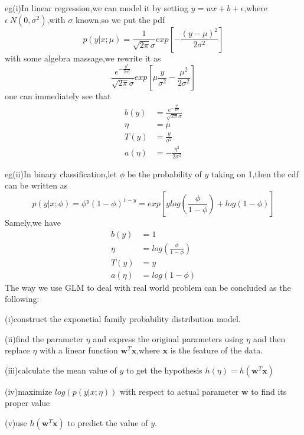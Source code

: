 \documentclass[a4paper,12pt]{article}
\begin{document}
eg(i)In linear regression,we can model it by setting $y=wx+b+\epsilon$,where $\epsilon~N(0,\sigma^2)$,with $\sigma$ known,so we put the pdf$$p(y|x;\mu)=\frac{1}{\sqrt{2\pi}\sigma}exp[-\frac{(y-\mu)^2}{2 \sigma^2}]$$with some algebra massage,we rewrite it as$$\frac{e^{-\frac{y^2}{2 \sigma^2}}}{\sqrt{2\pi}\sigma}exp[\mu\frac{y}{\sigma^2}-\frac{\mu^2}{2 \sigma^2}]$$one can immediately see that
\begin{align*}
	b(y) &= \frac{e^{-\frac{y^2}{2 \sigma^2}}}{\sqrt{2\pi}\sigma}\\
	\eta &= \mu\\
	T(y) &= \frac{y}{\sigma^2}\\
	a(\eta) &= -\frac{\eta^2}{2 \sigma^2}
\end{align*}

eg(ii)In binary classification,let $\phi$ be the probability of $y$ taking on 1,then the cdf can be written as$$p(y|x;\phi)=\phi^{y}(1-\phi)^{1-y}=exp[ylog(\frac{\phi}{1-\phi})+log(1-\phi)]$$
Samely,we have
\begin{align*}
	b(y) &= 1\\
	\eta &=log(\frac{\phi}{1-\phi})\\
	T(y) &=y\\
	a(\eta) &=log(1-\phi)
\end{align*}
The way we use GLM to deal with real world problem can be concluded as the following:

(i)construct the exponetial family probability distribution model.

(ii)find the parameter $\eta$ and express the original parameters using $\eta$ and then replace $\eta$ with a linear function $\bm{w}^{T}\bm{x}$,where $\bm{x}$ is the feature of the data.

(iii)calculate the mean value of $y$ to get the hypothesis $h(\eta)=h(\bm{w}^{T}\bm{x})$

(iv)maximize $log(p(y|x;\eta))$ with respect to actual parameter $\bm{w}$ to find its proper value

(v)use $h(\bm{w}^{T}\bm{x})$ to predict the value of $y$.
\end{document}
